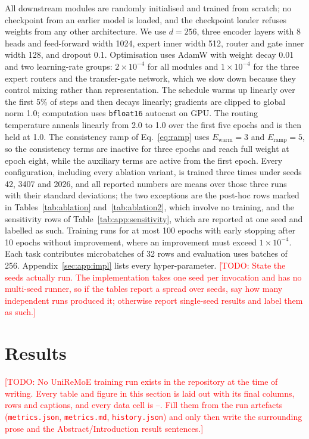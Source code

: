 \documentclass[webpdf,modern,large,namedate]{oup-authoring-template}
\theoremstyle{thmstyleone}
\theoremstyle{thmstyletwo}
\theoremstyle{thmstylethree}
\newcommand{\NA}{--}
\DeclareRobustCommand{\TODO}[1]{\textcolor{red}{[TODO: #1]}}
\newcommand{\method}{UniReMoE}
\newcommand{\dmodel}{d}
\begin{document}
All downstream modules are randomly initialised and trained from scratch; no
checkpoint from an earlier model is loaded, and the checkpoint loader refuses
weights from any other architecture. We use $\dmodel=256$, three encoder layers
with 8 heads and feed-forward width 1024, expert inner width 512, router and
gate inner width 128, and dropout 0.1. Optimisation uses AdamW with weight
decay 0.01 and two learning-rate groups: $2\times10^{-4}$ for all modules and
$1\times10^{-4}$ for the three expert routers and the transfer-gate network,
which we slow down because they control mixing rather than representation.
The schedule warms up linearly over the first 5\% of steps and then decays
linearly; gradients are clipped to global norm 1.0; computation uses
\texttt{bfloat16} autocast on GPU. The routing temperature anneals linearly
from 2.0 to 1.0 over the first five epochs and is then held at 1.0. The
consistency ramp of Eq.~\eqref{eq:ramp} uses $E_{\mathrm{warm}}=3$ and
$E_{\mathrm{ramp}}=5$, so the consistency terms are inactive for three epochs
and reach full weight at epoch eight, while the auxiliary terms are active from
the first epoch. Every configuration, including every ablation variant, is trained three times
under seeds 42, 3407 and 2026, and all reported numbers are means over those
three runs with their standard deviations; the two exceptions are the
post-hoc rows marked in Tables~\ref{tab:ablation}
and~\ref{tab:ablation2}, which involve no training, and the
sensitivity rows of Table~\ref{tab:app:sensitivity}, which are reported at one
seed and labelled as such. Training runs for at most 100 epochs with early stopping after
10 epochs without improvement, where an improvement must exceed
$1\times10^{-4}$. Each task contributes microbatches of 32 rows and evaluation
uses batches of 256. Appendix~\ref{sec:app:impl} lists every hyper-parameter.
\TODO{State the seeds actually run. The implementation takes one seed per
invocation and has no multi-seed runner, so if the tables report a spread over
seeds, say how many independent runs produced it; otherwise report single-seed
results and label them as such.}

\section{Results}\label{sec:results}

\TODO{No \method{} training run exists in the repository at the time of
writing. Every table and figure in this section is laid out with its final
columns, rows and captions, and every data cell is \NA{}. Fill them from the
run artefacts (\texttt{metrics.json}, \texttt{metrics.md},
\texttt{history.json}) and only then write the surrounding prose and the
Abstract/Introduction result sentences.}
\end{document}
